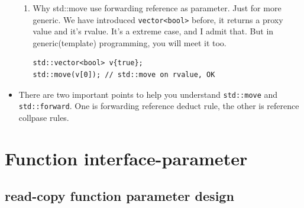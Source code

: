 \documentclass[a4paper,11pt,twoside]{book}
\begin{document}
\begin{itemize}
\begin{enumerate}
    \item Why std::move use forwarding reference as parameter. Just for more generic. We have introduced \texttt{vector<bool>} before, it returns a proxy value and it's rvalue. It's a extreme case, and I admit that. But in generic(template) programming, you will meet it too.
\begin{lstlisting}[]
std::vector<bool> v{true};
std::move(v[0]); // std::move on rvalue, OK
\end{lstlisting}
        \end{enumerate}
    
    \item There are two important points to help you understand \texttt{std::move} and \texttt{std::forward}. One is forwarding reference deduct rule, the other is reference collpase rules.
\end{itemize}


\section{Function interface-parameter}

\subsection{read-copy function parameter design}
\end{document}
